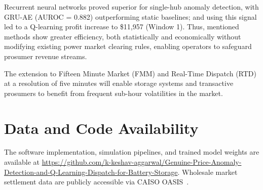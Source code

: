 \documentclass[journal]{IEEEtran}
\begin{document}
Recurrent neural networks proved superior for single-hub anomaly detection, with GRU-AE (AUROC = 0.882) outperforming static baselines; and using this signal led to a Q-learning profit increase to \$11,957 (Window 1). 
Thus, mentioned methods show greater efficiency, both statistically and economically without modifying existing power market clearing rules, enabling operators to safeguard prosumer revenue streams. 

The extension to Fifteen Minute Market (FMM) and Real-Time Dispatch (RTD) at a resolution of five minutes will enable storage systems and transactive prosumers to benefit from frequent sub-hour volatilities in the market.

\section*{Data and Code Availability}
The software implementation, simulation pipelines, and trained model weights are available at \url{https://github.com/k-keshav-aggarwal/Genuine-Price-Anomaly-Detection-and-Q-Learning-Dispatch-for-Battery-Storage}. Wholesale market settlement data are publicly accessible via CAISO OASIS~\cite{CAISO}.



\end{document}
